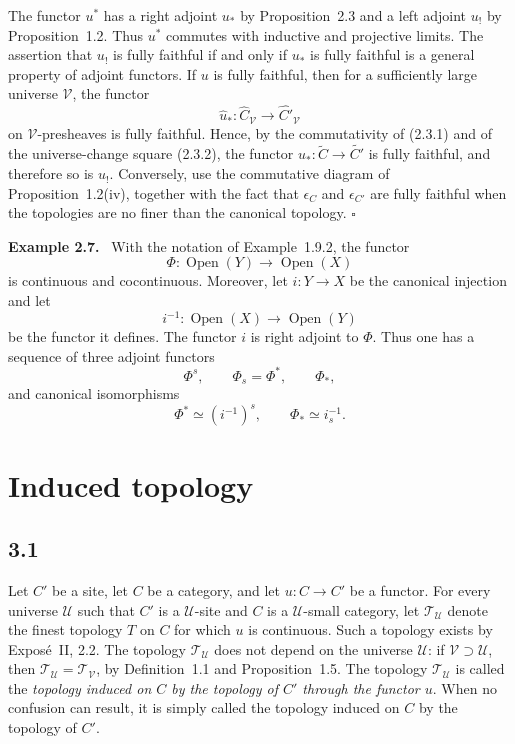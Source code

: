 \documentclass[11pt]{article}
\newcommand{\U}{\mathcal{U}}
\newcommand{\V}{\mathcal{V}}
\newcommand{\T}{\mathcal{T}}
\newcommand{\Open}{\operatorname{Open}}
\newcommand{\qedtext}{\hfill\(\square\)}
\newenvironment{remarktext}[1]{\par\medskip\noindent\textbf{#1.}\ }{\par\medskip}
\begin{document}
The functor \(u^*\) has a right adjoint \(u_*\) by Proposition~2.3 and a left adjoint \(u_!\) by Proposition~1.2. Thus \(u^*\) commutes with inductive and projective limits. The assertion that \(u_!\) is fully faithful if and only if \(u_*\) is fully faithful is a general property of adjoint functors. If \(u\) is fully faithful, then for a sufficiently large universe \(\V\), the functor
\[
\widehat u_*:\widehat C_{\V}\to\widehat{C'}_{\V}
\]
on \(\V\)-presheaves is fully faithful. Hence, by the commutativity of (2.3.1) and of the universe-change square (2.3.2), the functor \(u_*:\widetilde C\to\widetilde{C'}\) is fully faithful, and therefore so is \(u_!\). Conversely, use the commutative diagram of Proposition~1.2(iv), together with the fact that \(\epsilon_C\) and \(\epsilon_{C'}\) are fully faithful when the topologies are no finer than the canonical topology. \qedtext

\begin{remarktext}{Example 2.7}
With the notation of Example~1.9.2, the functor
\[
\Phi:\Open(Y)\to\Open(X)
\]
is continuous and cocontinuous. Moreover, let \(i:Y\to X\) be the canonical injection and let
\[
i^{-1}:\Open(X)\to\Open(Y)
\]
be the functor it defines. The functor \(i\) is right adjoint to \(\Phi\). Thus one has a sequence of three adjoint functors
\[
\Phi^s,
\qquad
\Phi_s=\Phi^*,
\qquad
\Phi_* ,
\]
and canonical isomorphisms
\[
\Phi^*\simeq (i^{-1})^s,
\qquad
\Phi_*\simeq i^{-1}_s.
\]
\end{remarktext}

\section{Induced topology}

\subsection*{3.1}
Let \(C'\) be a site, let \(C\) be a category, and let \(u:C\to C'\) be a functor. For every universe \(\U\) such that \(C'\) is a \(\U\)-site and \(C\) is a \(\U\)-small category, let \(\T_{\U}\) denote the finest topology \(T\) on \(C\) for which \(u\) is continuous. Such a topology exists by Expos\'e~II, 2.2. The topology \(\T_{\U}\) does not depend on the universe \(\U\): if \(\V\supset\U\), then \(\T_{\U}=\T_{\V}\), by Definition~1.1 and Proposition~1.5. The topology \(\T_{\U}\) is called the \emph{topology induced on \(C\) by the topology of \(C'\) through the functor \(u\)}. When no confusion can result, it is simply called the topology induced on \(C\) by the topology of \(C'\).
\end{document}
